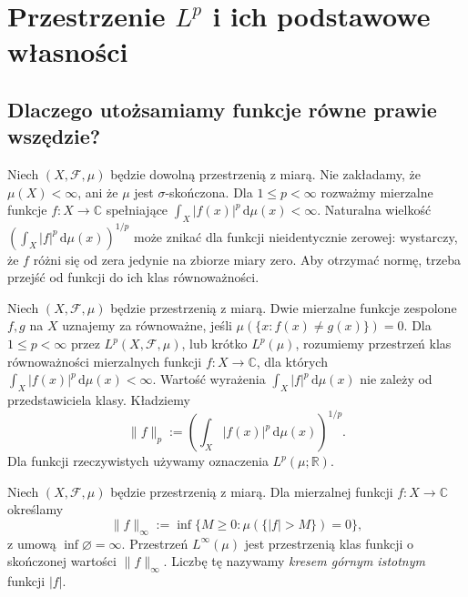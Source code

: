 \chapter{Przestrzenie \texorpdfstring{$L^p$}{L\string^p} i ich podstawowe własności}
\label{ch:przestrzenie-lp}

\providecommand{\atlasref}[2]{#2}


\section{Dlaczego utożsamiamy funkcje równe prawie wszędzie?}
Niech $(X,\mathcal F,\mu)$ będzie dowolną przestrzenią z miarą.
Nie zakładamy, że $\mu(X)<\infty$, ani że $\mu$ jest $\sigma$-skończona.
Dla $1\le p<\infty$ rozważmy mierzalne funkcje
$f:X\to\mathbb C$ spełniające
$\int_X|f(x)|^p\,\mathrm d\mu(x)<\infty$.
Naturalna wielkość
$(\int_X|f|^p\,\mathrm d\mu(x))^{1/p}$
może znikać dla funkcji nieidentycznie zerowej:
wystarczy, że $f$ różni się od zera jedynie na zbiorze
miary zero. Aby otrzymać normę, trzeba przejść
od funkcji do ich klas równoważności.

\begin{definicja}
\label{def:lp-14}
Niech $(X,\mathcal F,\mu)$ będzie przestrzenią z miarą.
Dwie mierzalne funkcje zespolone $f,g$ na $X$
uznajemy za równoważne, jeśli $\mu(\{x:f(x)\ne g(x)\})=0$.
Dla $1\le p<\infty$ przez $L^p(X,\mathcal F,\mu)$, lub
krótko $L^p(\mu)$, rozumiemy przestrzeń klas
równoważności mierzalnych funkcji $f:X\to\mathbb C$,
dla których $\int_X|f(x)|^p\,\mathrm d\mu(x)<\infty$.
Wartość wyrażenia $\int_X|f|^p\,\mathrm d\mu(x)$
nie zależy od przedstawiciela klasy. Kładziemy
\begin{equation}\label{eq:p-norm-14}
\|f\|_p:=\left(\int_X|f(x)|^p\,\mathrm d\mu(x)\right)^{1/p}.
\end{equation}
Dla funkcji rzeczywistych używamy oznaczenia $L^p(\mu;\mathbb R)$.
\end{definicja}

\begin{definicja}
\label{def:linf-14}
Niech $(X,\mathcal F,\mu)$ będzie przestrzenią z miarą.
Dla mierzalnej funkcji $f:X\to\mathbb C$ określamy
\[
\|f\|_\infty:=\inf\{M\ge0:\mu(\{|f|>M\})=0\},
\]
z umową $\inf\varnothing=\infty$.
Przestrzeń $L^\infty(\mu)$ jest przestrzenią klas
funkcji o skończonej wartości $\|f\|_\infty$.
Liczbę tę nazywamy \emph{kresem górnym istotnym} funkcji $|f|$.
\end{definicja}

